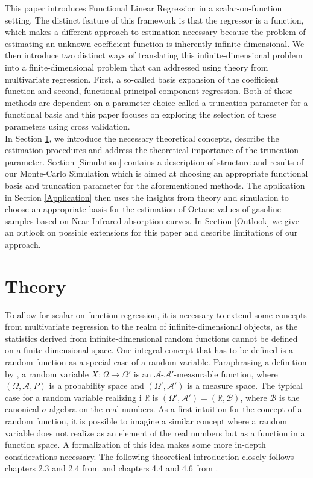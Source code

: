 \documentclass[11pt,twoside,a4paper]{article}
\begin{document}
	This paper introduces Functional Linear Regression in a scalar-on-function setting. The distinct feature of this framework is that the regressor is a function, which makes a different approach to estimation necessary because the problem of estimating an unknown coefficient function is inherently infinite-dimensional. 
	We then introduce two distinct ways of translating this infinite-dimensional problem into a finite-dimensional problem that can addressed using theory from multivariate regression. First, a so-called basis expansion of the coefficient function and second, functional principal component regression. Both of these methods are dependent on a parameter choice called a truncation parameter for a functional basis and this paper focuses on exploring the selection of these parameters using cross validation.\\
	
	In Section \ref{Theory}, we introduce the necessary theoretical concepts, describe the estimation procedures and address the theoretical importance of the truncation parameter. Section \ref{Simulation} contains a description of structure and results of our Monte-Carlo Simulation which is aimed at choosing an appropriate functional basis and truncation parameter for the aforementioned methods. The application in Section \ref{Application} then uses the insights from theory and simulation to choose an appropriate basis for the estimation of Octane values of gasoline samples based on Near-Infrared absorption curves. In Section \ref{Outlook} we give an outlook on possible extensions for this paper and describe limitations of our approach.

	\section{Theory}\label{Theory}
	To allow for scalar-on-function regression, it is necessary to extend some concepts from multivariate regression to the realm of infinite-dimensional objects, as the statistics derived from infinite-dimensional random functions cannot be defined on a finite-dimensional space. One integral concept that has to be defined is a random function as a special case of a random variable. Paraphrasing a definition by \cite{bauer_wahrscheinlichkeitstheorie_2020}, a random variable $X:\Omega \rightarrow \Omega'$ is an $\mathcal{A} \text{-} \mathcal{A'} \text{-measurable}$ function, where $(\Omega, \mathcal{A}, P)$ is a probability space and $(\Omega', \mathcal{A'})$ is a measure space. 
	The typical case for a random variable realizing i $\mathbb{R}$ is $(\Omega', \mathcal{A'}) = (\mathbb{R}, \mathcal{B})$, where $\mathcal{B}$ is the canonical $\sigma$-algebra on the real numbers. As a first intuition for the concept of a random function, it is possible to imagine a similar concept where a random variable does not realize as an element of the real numbers but as a function in a function space. A formalization of this idea makes some more in-depth considerations necessary. The following theoretical introduction closely follows chapters 2.3 and 2.4 from \cite{hsing_theoretical_2015} and chapters 4.4 and 4.6 from \cite{kokoszka_introduction_2017}. 
	
\end{document}
